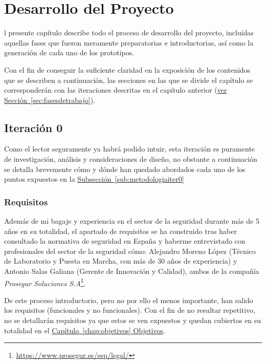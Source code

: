 \chapter{Desarrollo del Proyecto}
\label{chap:desarrollo}

l presente capítulo describe todo el proceso de desarrollo del proyecto, incluidas aquellas fases que fueron meramente preparatorias e introductorias, así como la generación de cada uno de los prototipos.

Con el fin de conseguir la suficiente claridad en la exposición de los contenidos que se describen a continuación, las secciones en las que se divide el capítulo se corresponderán con las iteraciones descritas en el capítulo anterior (\hyperref[sec:fasesdetrabajo]{ver Sección~\ref{sec:fasesdetrabajo}}). 

\section{Iteración 0}

Como el lector seguramente ya habrá podido intuir, esta iteración es puramente de investigación, análisis y consideraciones de diseño, no obstante a continuación se detalla brevemente cómo y dónde han quedado abordados cada uno de los puntos expuestos en la \hyperref[sub:metodologiaiter0]{Subsección~\ref{sub:metodologiaiter0}}

\subsection{Requisitos}

Además de mi bagaje y experiencia en el sector de la seguridad durante más de 5 años en su totalidad, el apartado de requisitos se ha construido tras haber consultado la normativa de seguridad en España y haberme entrevistado con profesionales del sector de la seguridad cómo: Alejandro Moreno López (Técnico de Laboratorio y Puesta en Marcha, con más de 30 años de experiencia) y Antonio Salas Galiana (Gerente de Innovación y Calidad), ambos de la compañía \textit{Prosegur Soluciones S.A}\footnote{\url{https://www.prosegur.es/esp/legal/}}.

De este proceso introductorio, pero no por ello el menos importante, han salido los requisitos (funcionales y no funcionales). Con el fin de no resultar repetitivo, no se detallarán requisitos ya que estos se ven expuestos y quedan cubiertos en su totalidad en el \hyperref[chap:objetivos]{Capítulo~\ref{chap:objetivos} Objetivos}.

